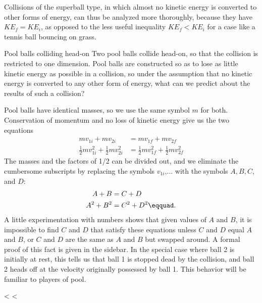 Collisions of the superball type, in which almost no kinetic
energy is converted to other forms of energy, can thus be
analyzed more thoroughly, because they have $KE_f=KE_i$, as
opposed to the less useful inequality $KE_f<KE_i$ for a
case like a tennis ball bouncing on grass.


\begin{eg}{Pool balls colliding head-on}\label{eg:pool-balls}
\egquestion Two pool balls collide head-on, so that the
collision is restricted to one dimension. Pool balls are
constructed so as to lose as little kinetic energy as
possible in a collision, so under the assumption that no
kinetic energy is converted to any other form of energy,
what can we predict about the results of such a collision?

\eganswer Pool balls have identical masses, so we use the
same symbol $m$ for both. Conservation of momentum and no loss
of kinetic energy give us the two equations
\begin{align*}
  mv_{1i}+mv_{2i} &=  mv_{1f}+mv_{2f} \\
  \frac{1}{2}mv_{1i}^2+\frac{1}{2}mv_{2i}^2 &=  \frac{1}{2}mv_{1f}^2+\frac{1}{2}mv_{2f}^2
\end{align*}
The masses and the factors of 1/2 can be divided out, and we
eliminate the cumbersome subscripts by replacing the symbols
$v_{1i}$,... with the symbols $A,B,C$, and $D$:
\begin{align*}
 A+B &= C+D \\
 A^2+B^2 &= C^2+D^2\eqquad.
\end{align*}
A little experimentation with numbers shows that given
values of $A$ and $B$, it is impossible to find $C$ and $D$
that satisfy these equations unless $C$ and $D$ equal $A$
and $B$, or $C$ and $D$ are the same as $A$ and $B$ but
swapped around. A formal proof of this fact is given in the
sidebar.
In the special case where ball 2 is initially at
rest, this tells us that ball 1 is stopped dead by the
collision, and ball 2 heads off at the velocity originally
possessed by ball 1. This behavior will be familiar to players of pool.
\end{eg}
<%
%
<%

